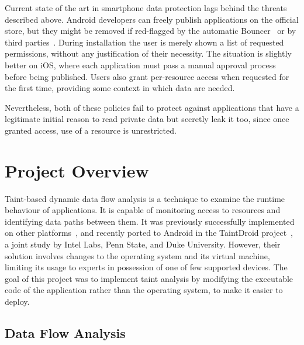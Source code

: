 \documentclass[12pt,twoside,notitlepage]{report}
\begin{document}
Current state of the art in smartphone data protection lags behind the threats described above. Android developers can freely publish applications on the official store, but they might be removed if red-flagged by the automatic Bouncer~\cite{web:Bouncer} or by third parties~\cite{web:LookoutPlayRemoval}. During installation the user is merely shown a list of requested permissions, without any justification of their necessity. The situation is slightly better on iOS, where each application must pass a manual approval process before being published. Users also grant per-resource access when requested for the first time, providing some context in which data are needed.

Nevertheless, both of these policies fail to protect against applications that have a legitimate initial reason to read private data but secretly leak it too, since once granted access, use of a resource is unrestricted.

\section{Project Overview}

Taint-based dynamic data flow analysis is a technique to examine the runtime behaviour of applications. It is capable of monitoring access to resources and identifying data paths between them. It was previously successfully implemented on other platforms~\cite{Zhu:2011:TPS:1945023.1945039}, and recently ported to Android in the TaintDroid project~\cite{Enck:2010:TIT:1924943.1924971}, a joint study by Intel Labs, Penn State, and Duke University. However, their solution involves changes to the operating system and its virtual machine, limiting its usage to experts in possession of one of few supported devices. The goal of this project was to implement taint analysis by modifying the executable code of the application rather than the operating system, to make it easier to deploy.

\subsection{Data Flow Analysis}
\end{document}
